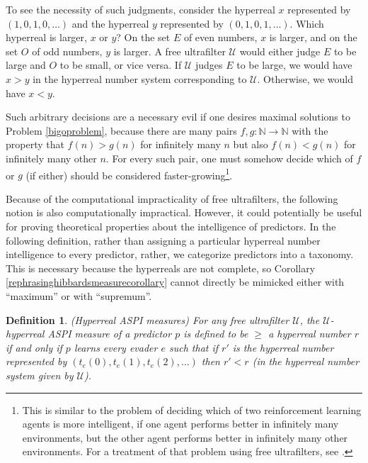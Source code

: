 \documentclass{article}
\newtheorem{definition}[theorem]{Definition}
\begin{document}
To see the necessity of such judgments, consider the hyperreal
$x$ represented by $(1,0,1,0,\ldots)$ and the hyperreal $y$ represented by
$(0,1,0,1,\ldots)$. Which hyperreal is larger, $x$ or $y$? On the set $E$ of
even numbers, $x$ is larger, and on the set $O$ of odd numbers, $y$ is larger.
A free ultrafilter $\mathcal U$ would either judge
$E$ to be large and $O$ to be small,
or vice versa. If $\mathcal U$ judges $E$ to be large,
we would have $x>y$ in the hyperreal number system corresponding to $\mathcal U$.
Otherwise, we would have $x<y$.

Such arbitrary decisions are a necessary evil if one desires maximal solutions to
Problem \ref{bigoproblem}, because there are many pairs $f,g:\mathbb N\to\mathbb N$
with the property that $f(n)>g(n)$ for infinitely many $n$ but also $f(n)<g(n)$ for
infinitely many other $n$. For every such pair, one must
somehow decide which of $f$ or $g$ (if either) should be
considered faster-growing\footnote{This is similar to the problem of deciding which
of two reinforcement learning agents is more intelligent, if one agent
performs better in infinitely many environments, but the other agent performs
better in infinitely many other environments. For a treatment of that problem
using free ultrafilters, see \cite{alexander2019intelligence}.}.

Because of the computational impracticality of free ultrafilters, the following notion
is also computationally impractical. However, it could potentially be useful for
proving theoretical properties about the intelligence of predictors. In the following
definition, rather than assigning a particular hyperreal number intelligence to every
predictor, rather, we categorize predictors into a taxonomy. This is necessary because
the hyperreals are not complete, so Corollary \ref{rephrasinghibbardsmeasurecorollary}
cannot directly be mimicked either with ``maximum'' or with ``supremum''.

\begin{definition}
\label{hyperrealhibbardintelligencedefn}
    (Hyperreal ASPI measures)
    For any free ultrafilter $\mathcal U$,
    the \emph{$\mathcal U$-hyperreal ASPI measure} of a predictor $p$ is defined to be
    $\geq$ a hyperreal number $r$ if and only if $p$ learns every evader $e$
    such that if $r'$ is the hyperreal number represented by
    $(t_e(0), t_e(1), t_e(2), \ldots)$ then $r'<r$
    (in the hyperreal number system given by $\mathcal U$).
\end{definition}
\end{document}
